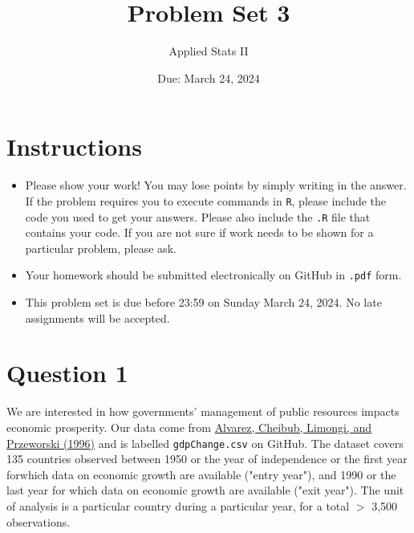 \documentclass[12pt,letterpaper]{article}
\title{Problem Set 3}
\date{Due: March 24, 2024}
\author{Applied Stats II}
\begin{document}
	\maketitle
	\section*{Instructions}
	\begin{itemize}
	\item Please show your work! You may lose points by simply writing in the answer. If the problem requires you to execute commands in \texttt{R}, please include the code you used to get your answers. Please also include the \texttt{.R} file that contains your code. If you are not sure if work needs to be shown for a particular problem, please ask.
\item Your homework should be submitted electronically on GitHub in \texttt{.pdf} form.
\item This problem set is due before 23:59 on Sunday March 24, 2024. No late assignments will be accepted.
	\end{itemize}

	\vspace{.25cm}
\section*{Question 1}
\vspace{.25cm}
\noindent We are interested in how governments' management of public resources impacts economic prosperity. Our data come from \href{https://www.researchgate.net/profile/Adam_Przeworski/publication/240357392_Classifying_Political_Regimes/links/0deec532194849aefa000000/Classifying-Political-Regimes.pdf}{Alvarez, Cheibub, Limongi, and Przeworski (1996)} and is labelled \texttt{gdpChange.csv} on GitHub. The dataset covers 135 countries observed between 1950 or the year of independence or the first year forwhich data on economic growth are available ("entry year"), and 1990 or the last year for which data on economic growth are available ("exit year"). The unit of analysis is a particular country during a particular year, for a total $>$ 3,500 observations. 
\end{document}
